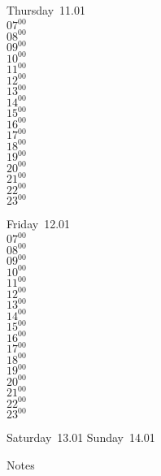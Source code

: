 \documentclass[11pt, a4paper]{book}\usepackage[]{graphicx}\usepackage[]{color}
\begin{document}
\begin{weekdaybox}
  Thursday~11.01\\
  { 
  \vfill
  $07^{00}$\\
$08^{00}$\\
$09^{00}$\\
$10^{00}$\\
$11^{00}$\\
$12^{00}$\\
$13^{00}$\\
$14^{00}$\\
$15^{00}$\\
$16^{00}$\\
$17^{00}$\\
$18^{00}$\\
$19^{00}$\\
$20^{00}$\\
$21^{00}$\\
$22^{00}$\\
$23^{00}$\\
  }
\end{weekdaybox} 
\begin{weekdaybox}
  Friday~12.01\\
  { 
  \vfill
  $07^{00}$\\
$08^{00}$\\
$09^{00}$\\
$10^{00}$\\
$11^{00}$\\
$12^{00}$\\
$13^{00}$\\
$14^{00}$\\
$15^{00}$\\
$16^{00}$\\
$17^{00}$\\
$18^{00}$\\
$19^{00}$\\
$20^{00}$\\
$21^{00}$\\
$22^{00}$\\
$23^{00}$\\
  }
\end{weekdaybox}
\begin{weekendbox}
  Saturday~13.01
  \tcblower
  Sunday~14.01
\end{weekendbox} %
\begin{notebox}
  Notes
\end{notebox}
\clearpage
\end{document}
